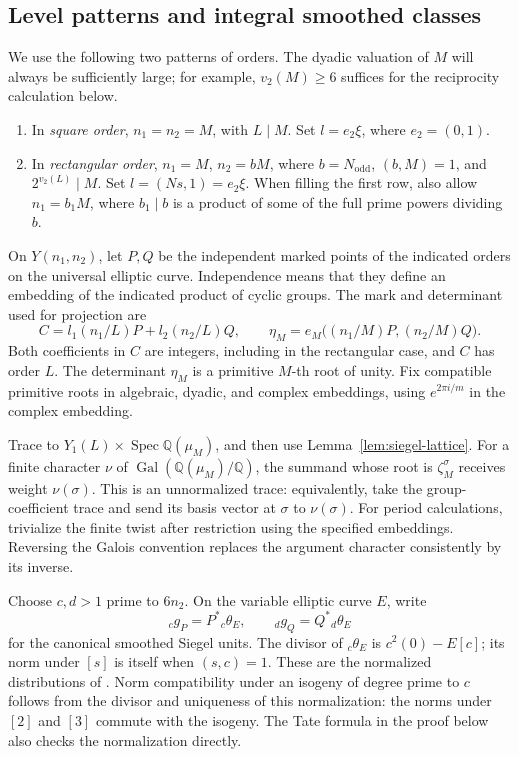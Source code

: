 \subsection{Level patterns and integral smoothed classes}

We use the following two patterns of orders.  The dyadic valuation of \(M\)
will always be sufficiently large; for example, \(v_2(M)\geq6\) suffices for
the reciprocity calculation below.

\begin{enumerate}[label=(\roman*)]
\item In \emph{square order}, \(n_1=n_2=M\), with \(L\mid M\).  Set
\(l=e_2\xi\), where \(e_2=(0,1)\).
\item In \emph{rectangular order}, \(n_1=M\), \(n_2=bM\), where
\(b=N_{\mathrm{odd}}\), \((b,M)=1\), and \(2^{v_2(L)}\mid M\).  Set
\(l=(Ns,1)=e_2\xi\).  When filling the first row, also allow
\(n_1=b_1M\), where \(b_1\mid b\) is a product of some of the full prime
powers dividing \(b\).
\end{enumerate}

On \(Y(n_1,n_2)\), let \(P,Q\) be the independent marked points of the
indicated orders on the universal elliptic curve.  Independence means that
they define an embedding of the indicated product of cyclic groups.
The mark and determinant used for projection are
\[
 C=l_1(n_1/L)P+l_2(n_2/L)Q,\qquad
 \eta_M=e_M\bigl((n_1/M)P,(n_2/M)Q\bigr).
\]
Both coefficients in \(C\) are integers, including in the rectangular
case, and \(C\) has order \(L\).  The determinant \(\eta_M\) is a primitive
\(M\)-th root of unity.  Fix compatible primitive roots in algebraic,
dyadic, and complex embeddings, using \(e^{2\pi i/m}\) in the complex
embedding.

Trace to
\(Y_1(L)\times\operatorname{Spec}\mathbb Q(\mu_M)\), and then use
Lemma~\ref{lem:siegel-lattice}.  For a finite character
\(\nu\) of \(\operatorname{Gal}(\mathbb Q(\mu_M)/\mathbb Q)\), the summand
whose root is \(\zeta_M^\sigma\) receives weight \(\nu(\sigma)\).
This is an unnormalized trace: equivalently, take the group-coefficient
trace and send its basis vector at \(\sigma\) to \(\nu(\sigma)\).
For period calculations, trivialize the finite twist after restriction
using the specified embeddings.  Reversing the Galois convention replaces
the argument character consistently by its inverse.

Choose \(c,d>1\) prime to \(6n_2\).  On the variable elliptic curve \(E\),
write
\[
                {}_c g_P=P^*{}_c\theta_E,\qquad
                {}_d g_Q=Q^*{}_d\theta_E
\]
for the canonical smoothed Siegel units.  The divisor of
\({}_c\theta_E\) is \(c^2(0)-E[c]\); its norm under \([s]\) is itself
when \((s,c)=1\).  These are the normalized distributions of
\cite{Kato04}.  Norm compatibility under an isogeny of degree prime to
\(c\) follows from the divisor and uniqueness of this normalization:
the norms under \([2]\) and \([3]\) commute with the isogeny.  The Tate
formula in the proof below also checks the normalization directly.

